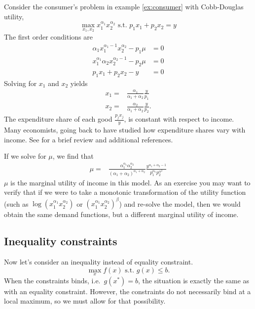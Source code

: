 \begin{example}
  Consider the consumer's problem in example \ref{ex:consumer} with
  Cobb-Douglas utility,
  \[ \max_{x_1,x_2} x_1^{\alpha_1} x_2^{\alpha_2} \text{ s.t. } p_1 x_1 + p_2
  x_2 = y \]
  The first order conditions are
  \begin{align*}
    \alpha_1 x_1^{\alpha_1 -1} x_2^{\alpha_2}- p_1 \mu & = 0 \\
    x_1^{\alpha_1} \alpha_2 x_2^{\alpha_2-1} - p_2 \mu & = 0  \\
    p_1 x_1 + p_2 x_2 - y & = 0
  \end{align*}
  Solving for $x_1$ and $x_2$ yields 
  \begin{align*}
    x_1 = & \frac{\alpha_1}{\alpha_1 + \alpha_2} \frac{y}{p_1} \\
    x_2 = & \frac{\alpha_2}{\alpha_1 + \alpha_2} \frac{y}{p_2}.
  \end{align*}
  The expenditure share of each good $\frac{p_j x_j}{y}$, is constant
  with respect to income. Many economists, going back to
  \cite{engel1857} have studied how expenditure shares vary with
  income. See \cite{lewbel2008} for a brief review and additional
  references. 

  If we solve for $\mu$, we find that 
  \begin{align*}
    \mu = & \frac{\alpha_1^{\alpha_1} \alpha_2^{\alpha_2}}
    {(\alpha_1 + \alpha_2)^{\alpha_1+\alpha_2}}
    \frac{y^{\alpha_1+\alpha_2 -1}} {p_1^{\alpha_1} p_2^{\alpha^2} }
  \end{align*}
  $\mu$ is the marginal utility of income in this model. As an
  exercise you may want to verify that if we were to take a monotonic
  transformation of the utility function (such as $\log(x_1^{\alpha_1}
  x_2^{\alpha_2})$ or $(x_1^{\alpha_1} x_2^{\alpha_2})^\beta$) and
  re-solve the model, then we would obtain the same demand functions,
  but a different marginal utility of income. 
\end{example}

\subsection{Inequality constraints}

Now let's consider an inequality instead of equality constraint. 
\[ \max_{x} f(x) \text{ s.t. } g(x) \leq b. \] 
When the constraints binds, i.e.\ $g(x^*) = b$, the situation is exactly the
same as with an equality constraint. However, the constraints do not
necessarily bind at a local maximum, so we must allow for that
possibility.  

